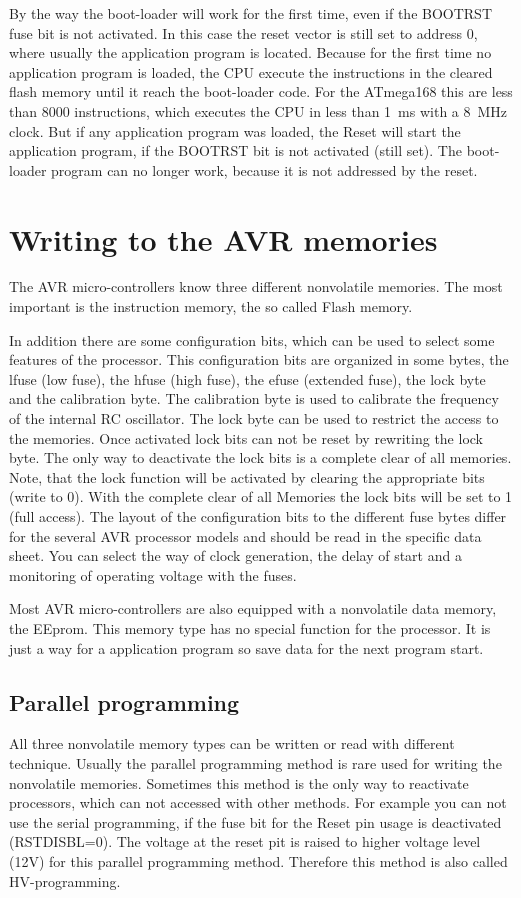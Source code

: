 By the way the boot-loader will work for the first time,
even if the BOOTRST fuse bit is not activated.
In this case the reset vector is still set to address 0, where
usually the application program is located.
Because for the first time no application program is loaded,
the CPU execute the instructions in the cleared flash memory
until it reach the boot-loader code.
For the ATmega168 this are less than 8000 instructions,
which executes the CPU in less than 1~ms with a 8~MHz clock.
But if any application program was loaded, the Reset will
start the application program, if the BOOTRST bit is not activated (still set).
The boot-loader program can no longer work, because it is
not addressed by the reset.


\section{Writing to the AVR memories}

The AVR micro-controllers know three different nonvolatile memories.
The most important is the instruction memory, the so called Flash memory.

In addition there are some configuration bits, which can be used to
select some features of the processor.
This configuration bits are organized in some bytes, the lfuse (low fuse),
the hfuse (high fuse), the efuse (extended fuse), the lock byte and the calibration byte.
The calibration byte is used to calibrate the frequency of the internal RC oscillator.
The lock byte can be used to restrict the access to the memories.
Once  activated lock bits can not be reset by rewriting the lock byte.
The only way to deactivate the lock bits is a complete clear of all memories.
Note, that the lock function will be activated by clearing the appropriate bits
(write to 0).
With the complete clear of all Memories the lock bits will be set to 1 (full access).
The layout of the configuration bits to the different fuse bytes differ for
the several AVR processor models and should be read in the specific data sheet.
You can select the way of clock generation, the delay of start and a
monitoring of operating voltage with the fuses.

Most AVR micro-controllers are also equipped with a nonvolatile data memory, the EEprom.
This memory type has no special function for the processor.
It is just a way for a application program so save data for the next
program start.


\subsection{Parallel programming}
All three nonvolatile memory types can be written or read with different technique.
Usually the parallel programming method is rare used for writing the nonvolatile memories.
Sometimes this method is the only way to reactivate processors, which can not
accessed with other methods.
For example you can not use the serial programming, if the fuse bit for the
Reset pin usage is deactivated (RSTDISBL=0).
The voltage at the reset pit is raised to higher voltage level (12V) for this parallel
programming method. Therefore this method is also called HV-programming.

